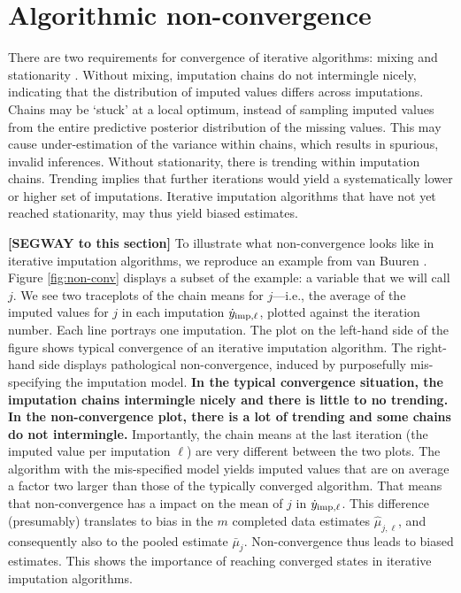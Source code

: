 \documentclass[Royal,times,sageh]{sagej}
\begin{document}
\hypertarget{algorithmic-non-convergence}{%
\section{Algorithmic non-convergence}\label{algorithmic-non-convergence}}

There are two requirements for convergence of iterative algorithms: mixing and stationarity \citep{gelm13}. Without mixing, imputation chains do not intermingle nicely, indicating that the distribution of imputed values differs across imputations. Chains may be `stuck' at a local optimum, instead of sampling imputed values from the entire predictive posterior distribution of the missing values. This may cause under-estimation of the variance within chains, which results in spurious, invalid inferences. Without stationarity, there is trending within imputation chains. Trending implies that further iterations would yield a systematically lower or higher set of imputations. Iterative imputation algorithms that have not yet reached stationarity, may thus yield biased estimates.

\textbf{{[}SEGWAY to this section{]}} To illustrate what non-convergence looks like in iterative imputation algorithms, we reproduce an example from van Buuren \citeyearpar[\(\S\) 6.5.2]{buur18}. Figure \ref{fig:non-conv} displays a subset of the example: a variable that we will call \(j\). We see two traceplots of the chain means for \(j\)---i.e., the average of the imputed values for \(j\) in each imputation \(\dot y_{\rm imp, \ell}\), plotted against the iteration number. Each line portrays one imputation. The plot on the left-hand side of the figure shows typical convergence of an iterative imputation algorithm. The right-hand side displays pathological non-convergence, induced by purposefully mis-specifying the imputation model. \textbf{In the typical convergence situation, the imputation chains intermingle nicely and there is little to no trending. In the non-convergence plot, there is a lot of trending and some chains do not intermingle.} Importantly, the chain means at the last iteration (the imputed value per imputation \(\ell\)) are very different between the two plots. The algorithm with the mis-specified model yields imputed values that are on average a factor two larger than those of the typically converged algorithm. That means that non-convergence has a impact on the mean of \(j\) in \(\dot y_{\rm imp, \ell}\). This difference (presumably) translates to bias in the \(m\) completed data estimates \(\hat{\mu}_{j,\ell}\), and consequently also to the pooled estimate \(\bar{\mu}_j\). Non-convergence thus leads to biased estimates. This shows the importance of reaching converged states in iterative imputation algorithms.
\end{document}
